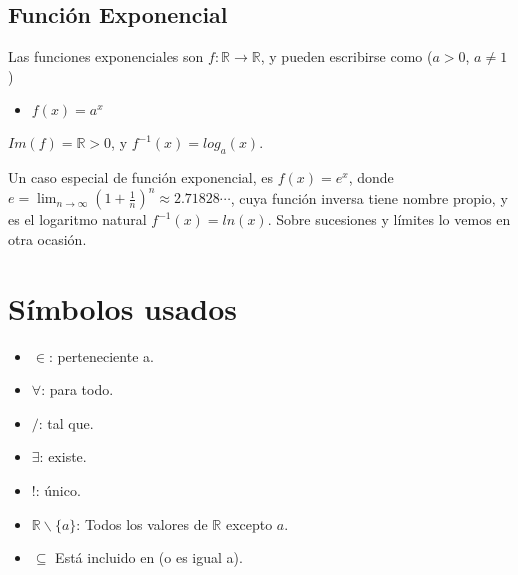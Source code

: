 \documentclass[%
 aip,
 jmp,%
 amsmath,amssymb,
 reprint,%
]{revtex4-1}
\begin{document}
\subsection{Función Exponencial}
Las funciones exponenciales son $f: \mathbb{R} \rightarrow \mathbb{R}$, y pueden escribirse como ($a>0$, $a \neq 1$)
\begin{itemize}
\item $f(x)= a ^ x$
\end{itemize}

$Im(f)=\mathbb{R}>0$, y $f^{-1}(x)=log_a(x)$.

Un caso especial de función exponencial, es $f(x)=e^x$, donde $e=\lim_{n\to\infty} (1 + \frac{1}{n})^n \approx 2.71828\cdots$, cuya función inversa tiene nombre propio, y es el logaritmo natural $f^{-1}(x)=ln(x)$. Sobre sucesiones y límites lo vemos en otra ocasión.

\section{Símbolos usados}
\begin{itemize}
\item $\in$: perteneciente a.
\item $\forall$: para todo.
\item $/$: tal que.
\item $\exists$: existe.
\item $!$: único.
\item $\mathbb{R}\smallsetminus \{a\}$: Todos los valores de $\mathbb{R}$ excepto $a$.
\item $\subseteq$ Está incluido en (o es igual a).
\end{itemize}
\end{document}
